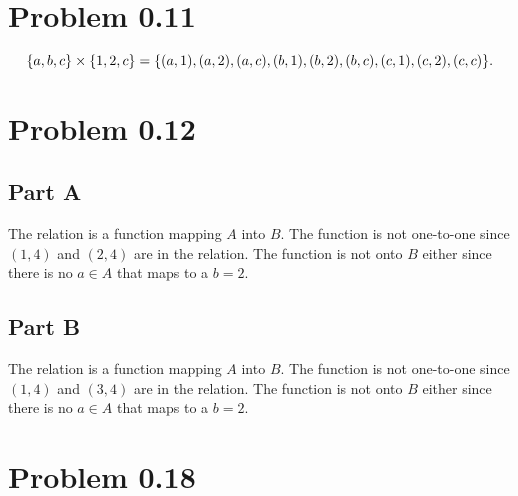 \documentclass[12pt]{extarticle}
\begin{document}
\section*{Problem 0.11}

\[
	\qty{a,b,c} \times \qty{1,2,c} = \qty{(a,1),(a,2),(a,c),(b,1),(b,2),(b,c),(c,1),(c,2),(c,c)}
.\]

\section*{Problem 0.12}
\subsection*{Part A}

The relation is a function mapping $A$ into $B$. The function is not one-to-one since $(1,4)$ and $(2,4)$ are in the relation. The function is not onto $B$ either since there is no $a \in A$ that maps to a $b=2$.

\subsection*{Part B}

The relation is a function mapping $A$ into $B$. The function is not one-to-one since $(1,4)$ and $(3,4)$ are in the relation. The function is not onto $B$ either since there is no $a \in A$ that maps to a $b=2$.

\section*{Problem 0.18}
\end{document}
